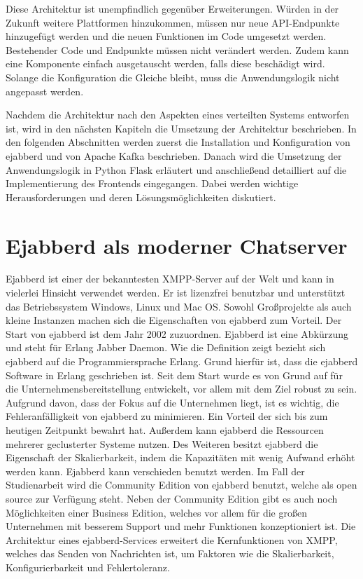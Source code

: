 \documentclass[a4paper,titlepage,halfparskip,12pt]{scrreprt}
\begin{document}
\begin{onehalfspacing}
Diese Architektur ist unempfindlich gegenüber Erweiterungen. Würden in der Zukunft weitere Plattformen hinzukommen, müssen nur neue \acs{API}-Endpunkte hinzugefügt werden und die neuen Funktionen im Code umgesetzt werden. Bestehender Code und Endpunkte müssen nicht verändert werden. Zudem kann eine Komponente einfach ausgetauscht werden, falls diese beschädigt wird. Solange die Konfiguration die Gleiche bleibt, muss die Anwendungslogik nicht angepasst werden.

Nachdem die Architektur nach den Aspekten eines verteilten Systems entworfen ist, wird in den nächsten Kapiteln die Umsetzung der Architektur beschrieben. In den folgenden Abschnitten werden zuerst die Installation und Konfiguration von ejabberd und von Apache Kafka beschrieben. Danach wird die Umsetzung der Anwendungslogik in Python Flask erläutert und anschließend detailliert auf die Implementierung des Frontends eingegangen. Dabei werden wichtige Herausforderungen und deren Lösungsmöglichkeiten diskutiert.

\pagebreak

\section{Ejabberd als moderner Chatserver}
\label{sec:ejabberd}

Ejabberd ist einer der bekanntesten \ac{XMPP}-Server auf der Welt und kann in vielerlei Hinsicht verwendet werden. Er ist lizenzfrei benutzbar und unterstützt das Betriebssystem Windows, Linux und Mac OS. Sowohl Großprojekte als auch kleine Instanzen machen sich die Eigenschaften von ejabberd zum Vorteil. Der Start von ejabberd ist dem Jahr 2002 zuzuordnen. Ejabberd ist eine Abkürzung und steht für \glqq Erlang Jabber Daemon\grqq. Wie die Definition zeigt bezieht sich ejabberd auf die Programmiersprache Erlang. Grund hierfür ist, dass die ejabberd Software in Erlang geschrieben ist. Seit dem Start wurde es von Grund auf für die Unternehmensbereitstellung entwickelt, vor allem mit dem Ziel robust zu sein. Aufgrund davon, dass der Fokus auf die Unternehmen liegt, ist es wichtig, die Fehleranfälligkeit von ejabberd zu minimieren. Ein Vorteil der sich bis zum heutigen Zeitpunkt bewahrt hat. Außerdem kann ejabberd die Ressourcen mehrerer geclusterter Systeme nutzen. Des Weiteren besitzt ejabberd die Eigenschaft der Skalierbarkeit, indem die Kapazitäten mit wenig Aufwand erhöht werden kann. Ejabberd kann verschieden benutzt werden. Im Fall der Studienarbeit wird die Community Edition von ejabberd benutzt, welche als open source zur Verfügung steht. Neben der Community Edition gibt es auch noch Möglichkeiten einer Business Edition, welches vor allem für die großen Unternehmen mit besserem Support und mehr Funktionen konzeptioniert ist. Die Architektur eines ejabberd-Services erweitert die Kernfunktionen von \ac{XMPP}, welches das Senden von Nachrichten ist, um Faktoren wie die Skalierbarkeit, Konfigurierbarkeit und Fehlertoleranz.


\end{onehalfspacing}
\end{document}
